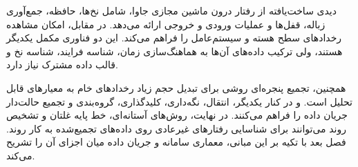 دیدی ساخت‌یافته از رفتار درون ماشین مجازی جاوا، شامل نخ‌ها، حافظه،
جمع‌آوری زباله، قفل‌ها و عملیات ورودی و خروجی ارائه می‌دهد. در مقابل، 
امکان مشاهده رخدادهای سطح هسته و سیستم‌عامل را فراهم می‌کند. این دو فناوری مکمل
یکدیگر هستند، ولی ترکیب داده‌های آن‌ها به هماهنگ‌سازی زمان، شناسه فرایند، شناسه
نخ و قالب داده مشترک نیاز دارد.

همچنین، تجمیع پنجره‌ای روشی برای تبدیل حجم زیاد رخدادهای خام به
معیارهای قابل تحلیل است.  و  در کنار یکدیگر،
انتقال، نگه‌داری، کلیدگذاری، گروه‌بندی و تجمیع حالت‌دار جریان داده را فراهم
می‌کنند. در نهایت، روش‌های آستانه‌ای، خط پایه غلتان و تشخیص روند می‌توانند برای
شناسایی رفتارهای غیرعادی روی داده‌های تجمیع‌شده به کار روند. فصل بعد با تکیه بر
این مبانی، معماری سامانه و جریان داده میان اجزای آن را تشریح می‌کند.